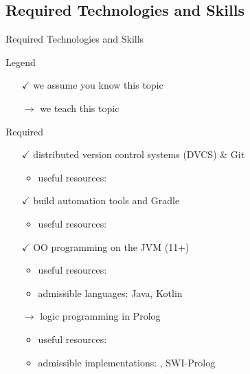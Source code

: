 \documentclass[presentation]{beamer}\mode<presentation>{\usetheme{AMSBolognaFC}}
\begin{document}
\subsection{Required Technologies and Skills}

\begin{frame}[c,allowframebreaks]{Required Technologies and Skills}

\begin{block}{Legend}
	\begin{multicols}{2}
		\begin{itemize}
			\item[$\checkmark$] we assume you know this topic
			\item[$\rightarrow$] we teach this topic
		\end{itemize}
	\end{multicols}
\end{block}

\framebreak

\begin{alertblock}{Required}
	\begin{itemize}
		\item[$\checkmark$] distributed version control systems (DVCS) \& \alert{Git}
		\begin{itemize}
			\item useful resources: 
		\end{itemize}

		\vfill

		\item[$\checkmark$] build automation tools and \alert{Gradle}
		\begin{itemize}
			\item useful resources: 
		\end{itemize}
		
		\vfill

		\item[$\checkmark$] OO programming on the JVM (11+)
		\begin{itemize}
			\item useful resources: \ccite{} %
			\item admissible languages: Java, \alert{Kotlin}
		\end{itemize}

		\vfill

		\item[$\rightarrow$] logic programming in Prolog
		\begin{itemize}
			\item useful resources: \ccite{}
			\item admissible implementations: \alert{\twopkt{}}, SWI-Prolog
		\end{itemize}


\end{itemize}
\end{alertblock}
\end{frame}
\end{document}
